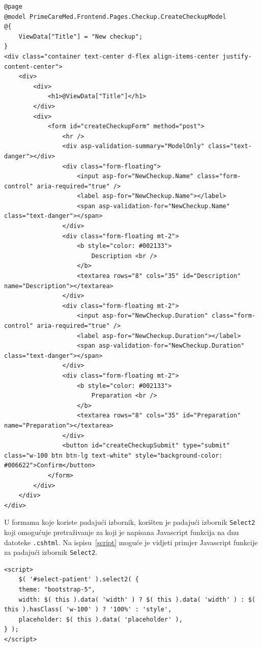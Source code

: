 \begin{lstlisting}[caption={Datoteka \texttt{CreateCheckup.cshtml}}, label=createCheckupHtml]
@page
@model PrimeCareMed.Frontend.Pages.Checkup.CreateCheckupModel
@{
    ViewData["Title"] = "New checkup";
}
<div class="container text-center d-flex align-items-center justify-content-center">
    <div>
        <div>
            <h1>@ViewData["Title"]</h1>
        </div>
        <div>
            <form id="createCheckupForm" method="post">
                <hr />
                <div asp-validation-summary="ModelOnly" class="text-danger"></div>
                <div class="form-floating">
                    <input asp-for="NewCheckup.Name" class="form-control" aria-required="true" />
                    <label asp-for="NewCheckup.Name"></label>
                    <span asp-validation-for="NewCheckup.Name" class="text-danger"></span>
                </div>
                <div class="form-floating mt-2">
                    <b style="color: #002133">
                        Description <br />
                    </b>
                    <textarea rows="8" cols="35" id="Description" name="Description"></textarea>
                </div>
                <div class="form-floating mt-2">
                    <input asp-for="NewCheckup.Duration" class="form-control" aria-required="true" />
                    <label asp-for="NewCheckup.Duration"></label>
                    <span asp-validation-for="NewCheckup.Duration" class="text-danger"></span>
                </div>
                <div class="form-floating mt-2">
                    <b style="color: #002133">
                        Preparation <br />
                    </b>
                    <textarea rows="8" cols="35" id="Preparation" name="Preparation"></textarea>
                </div>
                <button id="createCheckupSubmit" type="submit" class="w-100 btn btn-lg text-white" style="background-color: #006622">Confirm</button>
            </form>
        </div>
    </div>
</div>
\end{lstlisting}

U formama koje koriste padajući izbornik, korišten je padajući izbornik \texttt{Select2} koji omogućuje pretraživanje za koji je napisana Javascript funkcija na dnu datoteke \texttt{.cshtml}. Na ispisu~\ref{script} moguće je vidjeti primjer Javascript funkcije za padajući izbornik \texttt{Select2}.

\begin{lstlisting}[caption={Javascript funkcija za padajući izbornik \texttt{Select2}}, label=script]
<script>
    $( '#select-patient' ).select2( {
    theme: "bootstrap-5",
    width: $( this ).data( 'width' ) ? $( this ).data( 'width' ) : $( this ).hasClass( 'w-100' ) ? '100%' : 'style',
    placeholder: $( this ).data( 'placeholder' ),
} );
</script>
\end{lstlisting}

